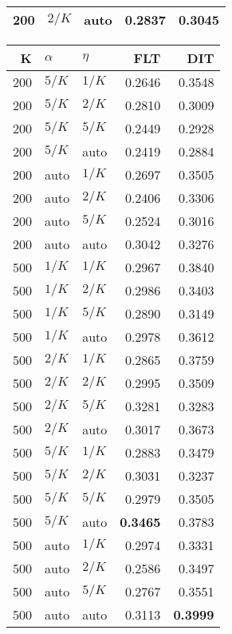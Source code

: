 \begin{table}
\begin{spacing}{1.2}
{\begin{tabular}{rll|rr}
 200 &  $2/K$ &   auto &           0.2837 & 0.3045 \\
\bottomrule
\end{tabular}
} \hfill \parbox{.45\linewidth}{\centering \begin{tabular}{rll|rr}
\toprule
   K &  $\alpha$ &    $\eta$ & FLT &       DIT \\
\midrule
 200 &  $5/K$ &  $1/K$ &           0.2646 &       0.3548 \\
 200 &  $5/K$ &  $2/K$ &           0.2810 &       0.3009 \\
 200 &  $5/K$ &  $5/K$ &           0.2449 &       0.2928 \\
 200 &  $5/K$ &   auto &           0.2419 &       0.2884 \\
 200 &   auto &  $1/K$ &           0.2697 &       0.3505 \\
 200 &   auto &  $2/K$ &           0.2406 &       0.3306 \\
 200 &   auto &  $5/K$ &           0.2524 &       0.3016 \\
 200 &   auto &   auto &           0.3042 &       0.3276 \\
 500 &  $1/K$ &  $1/K$ &           0.2967 &       0.3840 \\
 500 &  $1/K$ &  $2/K$ &           0.2986 &       0.3403 \\
 500 &  $1/K$ &  $5/K$ &           0.2890 &       0.3149 \\
 500 &  $1/K$ &   auto &           0.2978 &       0.3612 \\
 500 &  $2/K$ &  $1/K$ &           0.2865 &       0.3759 \\
 500 &  $2/K$ &  $2/K$ &           0.2995 &       0.3509 \\
 500 &  $2/K$ &  $5/K$ &           0.3281 &       0.3283 \\
 500 &  $2/K$ &   auto &           0.3017 &       0.3673 \\
 500 &  $5/K$ &  $1/K$ &           0.2883 &       0.3479 \\
 500 &  $5/K$ &  $2/K$ &           0.3031 &       0.3237 \\
 500 &  $5/K$ &  $5/K$ &           0.2979 &       0.3505 \\
 500 &  $5/K$ &   auto &     {\bf 0.3465} &       0.3783 \\
 500 &   auto &  $1/K$ &           0.2974 &       0.3331 \\
 500 &   auto &  $2/K$ &           0.2586 &       0.3497 \\
 500 &   auto &  $5/K$ &           0.2767 &       0.3551 \\
 500 &   auto &   auto &           0.3113 & {\bf 0.3999} \\
\bottomrule
\end{tabular}
}
\end{spacing}
\end{table}

